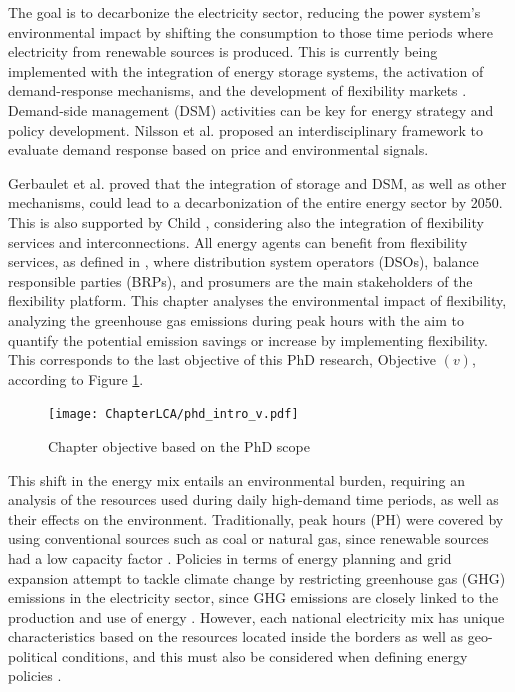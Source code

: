 The goal is to {decarbonize the electricity sector, reducing the power system's environmental impact by shifting the consumption to those time periods where electricity from renewable sources is produced}. This is currently being implemented with the integration of energy storage systems, the activation of demand-response mechanisms, and the development of flexibility markets \cite{USEFFoundation2015a,  LocalMicroPowerMarkets2019CH2}. Demand-side management (DSM) activities can be key for energy strategy and policy development. Nilsson et al. \cite{NILSSON2018273} proposed an interdisciplinary framework to evaluate demand response based on price and environmental signals.  {Gerbaulet et al. \cite{GERBAULET2019973} proved that the integration of storage and DSM, as well as other mechanisms, could lead to a decarbonization of the entire energy sector by 2050. This is also supported by Child \cite{CHILD201980}, considering also the integration of flexibility services and interconnections. All energy agents can benefit from flexibility services, as defined in \cite{Olivella2018}, where distribution system operators (DSOs), balance responsible parties (BRPs), and prosumers are the main stakeholders of the flexibility platform. This chapter analyses the environmental impact of flexibility, analyzing the greenhouse gas emissions during peak hours with the aim to quantify the potential emission savings or increase by implementing flexibility. This corresponds to the last objective of this PhD research, Objective $(v)$, according to Figure \ref{fig:chapter_obj_v}. 

\begin{figure}[h]
	\centering
	\texttt{[image: ChapterLCA/phd\_intro\_v.pdf]}
		\caption{Chapter objective based on the PhD scope}
	\label{fig:chapter_obj_v}  
\end{figure}


This shift in the energy mix entails an environmental burden, requiring an analysis of the resources used during  daily high-demand time periods, as well as their effects on the environment. Traditionally, peak hours (PH) were covered by using conventional sources such as coal or natural gas, since renewable sources had a low capacity factor \cite{NEVES2018905}. Policies in terms of energy planning and grid expansion attempt to tackle  climate change by restricting greenhouse gas (GHG) emissions in the electricity sector, since GHG emissions are closely linked to the production and use of energy \cite{Sinn2008PublicApproach}. However, each national electricity mix has unique characteristics based on the resources located inside the borders as well as geo-political conditions, and this must also be considered when defining energy policies \cite{Murdock2018, DAHAL2018222, LEVIN201953, BEST2018404, ZHAO2018303, SIMOES2017353}. 

}
